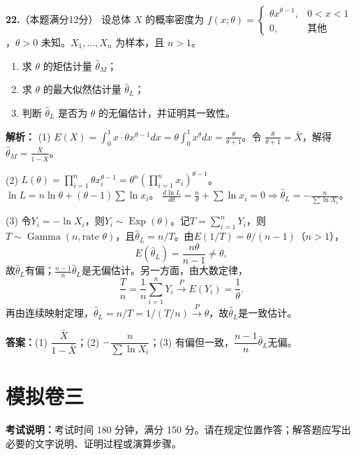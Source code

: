 \vspace{8pt}

\textbf{22.}（本题满分12分）
设总体 $X$ 的概率密度为 $f(x;\theta)=\begin{cases}\theta x^{\theta-1},&0<x<1\\0,&\text{其他}\end{cases}$，$\theta>0$ 未知。$X_1,\ldots,X_n$ 为样本，且 $n>1$。
\begin{enumerate}
    \item[(1)] 求 $\theta$ 的矩估计量 $\hat{\theta}_M$；
    \item[(2)] 求 $\theta$ 的最大似然估计量 $\hat{\theta}_L$；
    \item[(3)] 判断 $\hat{\theta}_L$ 是否为 $\theta$ 的无偏估计，并证明其一致性。
\end{enumerate}

\ifshowsolutions\par\noindent\textbf{解析：} (1) $E(X)=\int_0^1 x\cdot\theta x^{\theta-1}dx = \theta\int_0^1 x^{\theta}dx = \frac{\theta}{\theta+1}$。令 $\frac{\theta}{\theta+1}=\bar{X}$，解得 $\hat{\theta}_M=\frac{\bar{X}}{1-\bar{X}}$。

(2) $L(\theta)=\prod_{i=1}^n \theta x_i^{\theta-1} = \theta^n \left(\prod_{i=1}^n x_i\right)^{\theta-1}$。$\ln L = n\ln\theta + (\theta-1)\sum\ln x_i$。
$\frac{d\ln L}{d\theta} = \frac{n}{\theta} + \sum\ln x_i = 0 \Rightarrow \hat{\theta}_L = -\frac{n}{\sum\ln X_i}$。

(3) 令$Y_i=-\ln X_i$，则$Y_i\sim\operatorname{Exp}(\theta)$。记$T=\sum_{i=1}^nY_i$，则$T\sim\operatorname{Gamma}(n,\text{rate }\theta)$，且$\hat\theta_L=n/T$。由$E(1/T)=\theta/(n-1)$（$n>1$），
\[
E(\hat\theta_L)=\frac{n\theta}{n-1}\ne\theta,
\]
故$\hat\theta_L$有偏；$\frac{n-1}{n}\hat\theta_L$是无偏估计。另一方面，由大数定律，
\[
\frac{T}{n}=\frac1n\sum_{i=1}^nY_i\overset P\longrightarrow E(Y_i)=\frac1\theta.
\]
再由连续映射定理，$\hat\theta_L=n/T=1/(T/n)\overset P\longrightarrow\theta$，故$\hat\theta_L$是一致估计。
\par\noindent\textbf{答案：}(1) $\dfrac{\bar{X}}{1-\bar{X}}$；(2) $-\dfrac{n}{\sum\ln X_i}$；(3) 有偏但一致，$\dfrac{n-1}{n}\hat{\theta}_L$无偏。\else \answerarea[8] \fi


\newpage
\section{模拟卷三}

\noindent\textbf{考试说明：}考试时间 180 分钟，满分 150 分。请在规定位置作答；解答题应写出必要的文字说明、证明过程或演算步骤。

